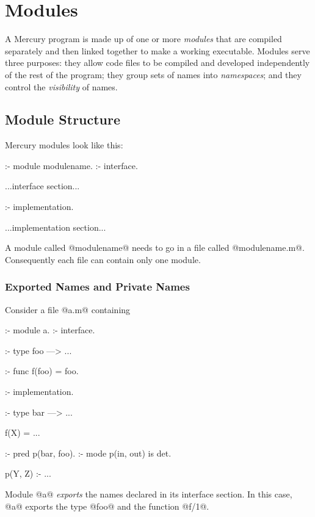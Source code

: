 
\chapter{Modules}

A Mercury program is made up of one or more \emph{modules} that are
compiled separately and then linked together to make a working
executable.  Modules serve three purposes: they allow code files to
be compiled and developed independently of the rest of the program; they
group sets of names into \emph{namespaces}; and they
control the \emph{visibility} of names.


\section{Module Structure}

Mercury modules look like this:
\begin{myverbatim}
:- module modulename.
:- interface.

    ...interface section...

:- implementation.

    ...implementation section...
\end{myverbatim}
A module called @modulename@ needs to go in a file called
@modulename.m@.  Consequently each file can contain only one module.

\subsection{Exported Names and Private Names}

Consider a file @a.m@ containing
\begin{myverbatim}
:- module a.
:- interface.

:- type foo ---> ...

:- func f(foo) = foo.

:- implementation.

:- type bar ---> ...

f(X) = ...

:- pred p(bar, foo).
:- mode p(in,  out) is det.

p(Y, Z) :- ...
\end{myverbatim}
Module @a@ \emph{exports} the names declared in its interface
section.  In this case, @a@ exports the type @foo@ and the function
@f/1@.


